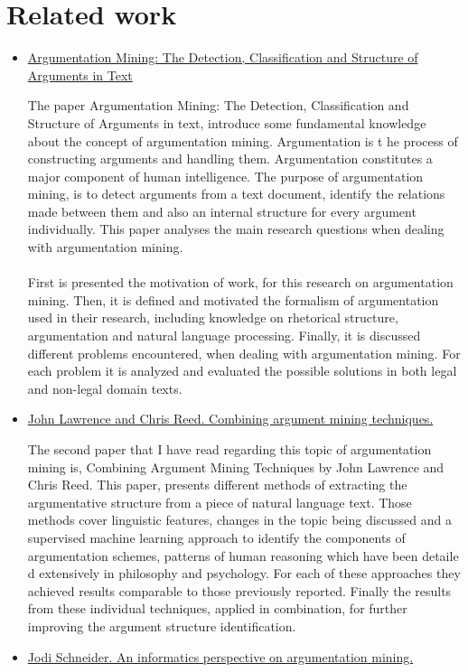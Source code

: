 \documentclass[a4paper,12pt]{report}
\begin{document}
\section{Related work}
\label{sec:relw}
\begin{itemize}
 \item \href{https://lirias.kuleuven.be/bitstream/123456789/234784/1/mochalesmoensicail09.pdf}{Argumentation Mining: The Detection, Classification and
Structure of Arguments in Text}

  The paper Argumentation Mining: The Detection, Classification and Structure of Arguments in text, introduce some fundamental knowledge about the concept of argumentation mining. Argumentation is t
he process of constructing arguments and handling them. Argumentation constitutes a major component of human intelligence. The purpose of argumentation mining, is to detect arguments from a text document, identify the relations 
made between them and also an internal structure for every argument individually. This paper analyses the main research questions when dealing with argumentation mining. 
\\\\
           First is presented the motivation of work, for this research on argumentation mining. Then, it is defined and motivated the formalism of argumentation used in their research, including knowledge on rhetorical 
structure, argumentation and natural language processing. Finally, it is discussed different problems encountered, when dealing with argumentation mining. For each problem it is analyzed and evaluated the possible solutions in 
both legal and non-legal domain texts. 
\\
 \item  \href{http://www.arg.dundee.ac.uk/people/chris/publications/2015/ArgMining2015.pdf}{John Lawrence and Chris Reed. Combining argument mining techniques.}
 

           The second paper that I have read regarding this topic of argumentation mining is, Combining Argument Mining Techniques by John Lawrence and Chris Reed. This paper, presents different methods of extracting the argumentative structure from a piece of natural language text. Those methods 
cover linguistic features, changes in the topic being discussed and a supervised machine learning approach to identify the components of argumentation schemes, patterns of human reasoning which have been detaile
d extensively in philosophy and psychology. For each of these approaches they achieved results comparable to those previously reported. Finally the results from these individual techniques, applied in combination, 
for further improving the argument structure identification. 
\\          
 \item \href{http://jodischneider.com/pubs/frontiersargnlp2014.pdf}{Jodi Schneider. An informatics perspective on argumentation mining.}
 

\end{itemize}
\end{document}
